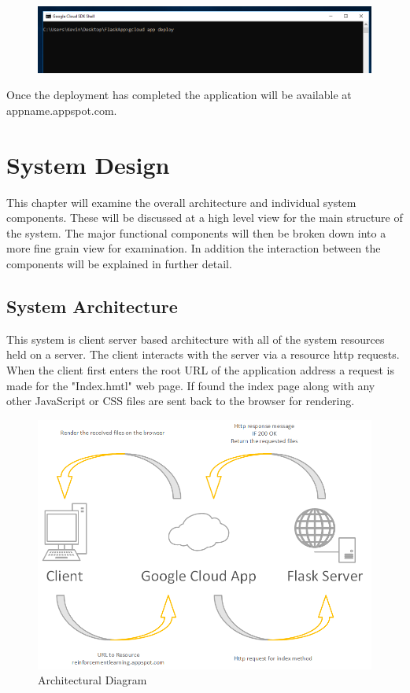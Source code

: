 \begin{figure}[H]
	\centering
	\includegraphics[width=0.7\linewidth]{img/DeployCmd}
	\caption{}
	\label{fig:deploycmd}
\end{figure}
Once the deployment has completed the application will be available at appname.appspot.com. ~\cite{FlaskAppGoolge:online}


\chapter{System Design}
This chapter will examine the overall architecture and individual system components. These will be discussed at a high level view for the main structure of the system. The major functional components will then be broken down into a more fine grain view for examination. In addition the interaction between the components will be explained in further detail.

\section{System Architecture}
This system is client server based architecture with all of the system resources held on a server. The client interacts with the server via a resource http requests. When the client first enters the root URL of the application address a request is made for the "Index.hmtl" web page. If found the index page along with any other JavaScript or CSS files are sent back to the browser for rendering.

\begin{figure}[H]
	\centering
	\includegraphics[width=0.7\linewidth]{img/Architecture}
	\caption{Architectural Diagram}
	\label{fig:architecture}
\end{figure}

